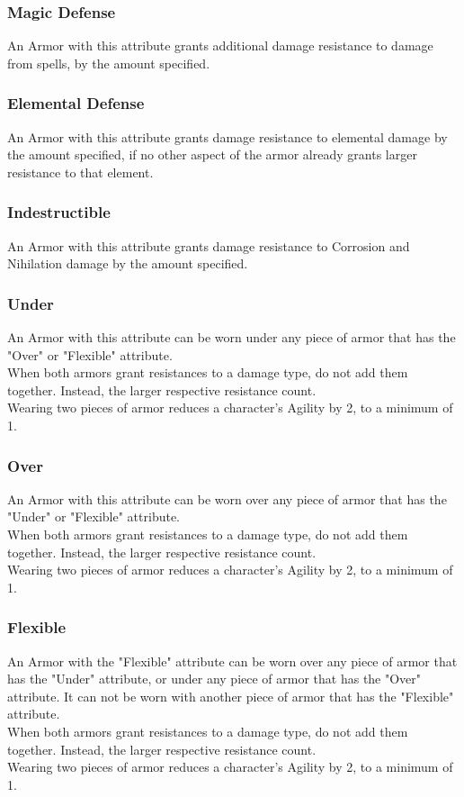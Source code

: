 \subsubsection{Magic Defense}\label{armor:magicDefense}
An Armor with this attribute grants additional damage resistance to damage from spells, by the amount specified.

\subsubsection{Elemental Defense}\label{armor:elementalDefense}
An Armor with this attribute grants damage resistance to elemental damage by the amount specified, if no other aspect of the armor already grants larger resistance to that element.

\subsubsection{Indestructible}\label{armor:indestructible}
An Armor with this attribute grants damage resistance to Corrosion and Nihilation damage by the amount specified.

\subsubsection{Under}\label{armor:under}
An Armor with this attribute can be worn under any piece of armor that has the "Over" or "Flexible" attribute.\\
When both armors grant resistances to a damage type, do not add them together.
Instead, the larger respective resistance count.\\
Wearing two pieces of armor reduces a character's Agility by 2, to a minimum of 1.

\subsubsection{Over}\label{armor:over}
An Armor with this attribute can be worn over any piece of armor that has the "Under" or "Flexible" attribute.\\
When both armors grant resistances to a damage type, do not add them together.
Instead, the larger respective resistance count.\\
Wearing two pieces of armor reduces a character's Agility by 2, to a minimum of 1.

\subsubsection{Flexible}\label{armor:flexible}
An Armor with the "Flexible" attribute can be worn over any piece of armor that has the "Under" attribute, or under any piece of armor that has the "Over" attribute. It can not be worn with another piece of armor that has the "Flexible" attribute.\\
When both armors grant resistances to a damage type, do not add them together.
Instead, the larger respective resistance count.\\
Wearing two pieces of armor reduces a character's Agility by 2, to a minimum of 1.